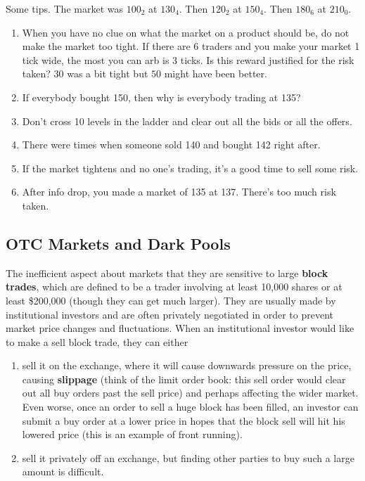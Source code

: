 \documentclass{article}
\begin{document}
    \begin{example}[2nd Session]
      \label{ex:2nd-session}
      Some tips. The market was $100_2$ at $130_4$. Then $120_2$ at $150_4$. Then $180_6$ at $210_0$. 
      \begin{enumerate}
        \item When you have no clue on what the market on a product should be, do not make the market too tight. If there are 6 traders and you make your market 1 tick wide, the most you can arb is 3 ticks. Is this reward justified for the risk taken? $30$ was a bit tight but $50$ might have been better. 

        \item If everybody bought 150, then why is everybody trading at 135?  

        \item Don't cross 10 levels in the ladder and clear out all the bids or all the offers. 

        \item There were times when someone sold 140 and bought 142 right after. 

        \item If the market tightens and no one's trading, it's a good time to sell some risk. 

        \item After info drop, you made a market of 135 at 137. There's too much risk taken. 
      \end{enumerate}
    \end{example}

  \subsection{OTC Markets and Dark Pools}

    The inefficient aspect about markets that they are sensitive to large \textbf{block trades}, which are defined to be a trader involving at least 10,000 shares or at least \$200,000 (though they can get much larger). They are usually made by institutional investors and are often privately negotiated in order to prevent market price changes and fluctuations. When an institutional investor would like to make a sell block trade, they can either 

    \begin{enumerate}
      \item sell it on the exchange, where it will cause downwards pressure on the price, causing \textbf{slippage} (think of the limit order book: this sell order would clear out all buy orders past the sell price) and perhaps affecting the wider market. Even worse, once an order to sell a huge block has been filled, an investor can submit a buy order at a lower price in hopes that the block sell will hit his lowered price (this is an example of front running). 

      \item sell it privately off an exchange, but finding other parties to buy such a large amount is difficult. 
    \end{enumerate}
\end{document}
